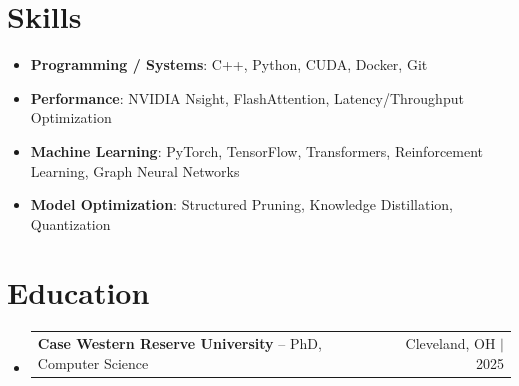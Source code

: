 \documentclass[letterpaper,13pt]{article}
\makeatletter
\newcommand{\resumeProjectHeading}[2]{
    \item
    \begin{tabular*}{\textwidth}{l@{\extracolsep{\fill}}r}
      \small#1 & #2 \\
    \end{tabular*}\vspace{-4pt}
}
\newcommand{\resumeSubHeadingListStart}{\begin{itemize}[leftmargin=0in, label={}]}
\newcommand{\resumeSubHeadingListEnd}{\end{itemize}}
\makeatother
\begin{document}
\section{Skills}
\vspace{0.02cm}
\begin{itemize}[leftmargin=0.15in, label={}, itemsep=2pt, topsep=1pt]
  \item \textbf{Programming / Systems}: C++, Python, CUDA, Docker, Git
  \item \textbf{Performance}: NVIDIA Nsight, FlashAttention, Latency/Throughput Optimization
  \item \textbf{Machine Learning}: PyTorch, TensorFlow, Transformers, Reinforcement Learning, Graph Neural Networks
  \item \textbf{Model Optimization}: Structured Pruning, Knowledge Distillation, Quantization
\end{itemize}
\vspace{0.02cm}

\section{Education}
\resumeSubHeadingListStart
  \resumeProjectHeading{\textbf{Case Western Reserve University} -- PhD, Computer Science}{Cleveland, OH $|$ 2025}
\resumeSubHeadingListEnd
\end{document}
